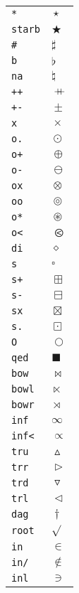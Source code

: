 \begin{longtable}{ll}
\texttt{*}&${}\star {}$\\
\texttt{starb}&${}\bigstar {}$\\
\texttt{\#}&${}\sharp {}$\\
\texttt{b}&${}\flat {}$\\
\texttt{na}&${}\natural {}$\\
\texttt{++}&${}\mathbin{{+}\mspace{-8mu}{+}} {}$\\
\texttt{+{-}}&${}\pm {}$\\
\texttt{x}&${}\times {}$\\
\texttt{o.}&${}\odot {}$\\
\texttt{o+}&${}\oplus {}$\\
\texttt{o{-}}&${}\ominus {}$\\
\texttt{ox}&${}\otimes {}$\\
\texttt{oo}&${}\circledcirc {}$\\
\texttt{o*}&${}\circledast {}$\\
\texttt{o<}&${}\olessthan {}$\\
\texttt{di}&${}\diamond {}$\\
\texttt{s}&${}\square {}$\\
\texttt{s+}&${}\boxplus {}$\\
\texttt{s{-}}&${}\boxminus {}$\\
\texttt{sx}&${}\boxtimes {}$\\
\texttt{s.}&${}\boxdot {}$\\
\texttt{O}&${}\bigcirc {}$\\
\texttt{qed}&${}\blacksquare {}$\\
\texttt{bow}&${}\bowtie {}$\\
\texttt{bowl}&${}\ltimes {}$\\
\texttt{bowr}&${}\rtimes {}$\\
\texttt{inf}&${}\infty {}$\\
\texttt{inf<}&${}\propto {}$\\
\texttt{tru}&${}\vartriangle {}$\\
\texttt{trr}&${}\vartriangleright {}$\\
\texttt{trd}&${}\triangledown {}$\\
\texttt{trl}&${}\vartriangleleft {}$\\
\texttt{dag}&${}\dagger {}$\\
\texttt{root}&${}\sqrt {}$\\
\texttt{in}&${}\in {}$\\
\texttt{in/}&${}\notin {}$\\
\texttt{inl}&${}\ni {}$\\

\end{longtable}
